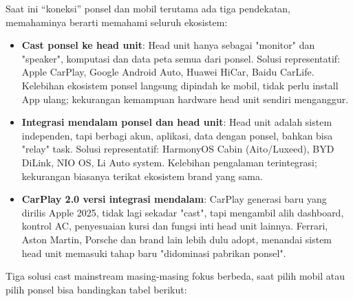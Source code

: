 


Saat ini “koneksi” ponsel dan mobil terutama ada tiga pendekatan, memahaminya berarti memahami seluruh ekosistem:

\begin{itemize}
  \item \textbf{Cast ponsel ke head unit}: Head unit hanya sebagai "monitor" dan "speaker", komputasi dan data peta semua dari ponsel. Solusi representatif: Apple CarPlay, Google Android Auto, Huawei HiCar, Baidu CarLife. Kelebihan ekosistem ponsel langsung dipindah ke mobil, tidak perlu install App ulang; kekurangan kemampuan hardware head unit sendiri menganggur.
  \item \textbf{Integrasi mendalam ponsel dan head unit}: Head unit adalah sistem independen, tapi berbagi akun, aplikasi, data dengan ponsel, bahkan bisa "relay" task. Solusi representatif: HarmonyOS Cabin (Aito/Luxeed), BYD DiLink, NIO OS, Li Auto system. Kelebihan pengalaman terintegrasi; kekurangan biasanya terikat ekosistem brand yang sama.
  \item \textbf{CarPlay 2.0 versi integrasi mendalam}: CarPlay generasi baru yang dirilis Apple 2025, tidak lagi sekadar "cast", tapi mengambil alih dashboard, kontrol AC, penyesuaian kursi dan fungsi inti head unit lainnya. Ferrari, Aston Martin, Porsche dan brand lain lebih dulu adopt, menandai sistem head unit memasuki tahap baru "didominasi pabrikan ponsel".
\end{itemize}


Tiga solusi cast mainstream masing-masing fokus berbeda, saat pilih mobil atau pilih ponsel bisa bandingkan tabel berikut:

